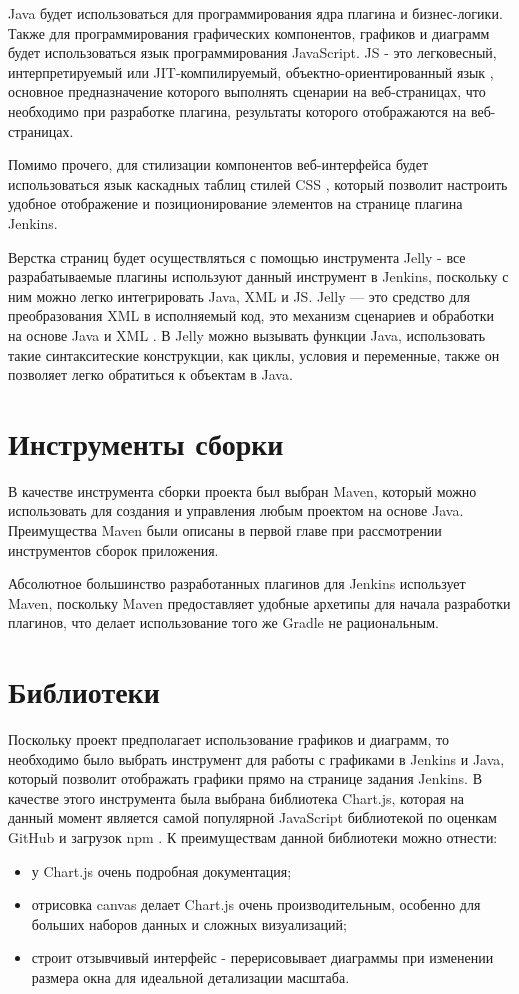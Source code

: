 Java будет использоваться для программирования ядра плагина и бизнес-логики. Также для программирования графических компонентов, графиков и диаграмм будет использоваться язык программирования JavaScript. JS - это легковесный, интерпретируемый или JIT-компилируемый, объектно-ориентированный язык \cite{js}, основное предназначение которого выполнять сценарии на веб-страницах, что необходимо при разработке плагина, результаты которого отображаются на веб-страницах.

Помимо прочего, для стилизации компонентов веб-интерфейса будет использоваться язык каскадных таблиц стилей CSS \cite{css}, который позволит настроить удобное отображение и позиционирование элементов на странице плагина Jenkins. 

Верстка страниц будет осуществляться с помощью инструмента Jelly - все разрабатываемые плагины используют данный инструмент в Jenkins, поскольку с ним можно легко интегрировать Java, XML и JS. Jelly — это средство для преобразования XML в исполняемый код, это механизм сценариев и обработки на основе Java и XML \cite{jelly}. В Jelly можно вызывать функции Java, использовать такие синтакситеские конструкции, как циклы, условия и переменные, также он позволяет легко обратиться к объектам в Java.

\section{Инструменты сборки} \label{ch1:sec5}

В качестве инструмента сборки проекта был выбран Maven, который можно использовать для создания и управления любым проектом на основе Java. Преимущества Maven были описаны в первой главе при рассмотрении инструментов сборок приложения.

Абсолютное большинство разработанных плагинов для Jenkins использует Maven, поскольку Maven предоставляет удобные архетипы для начала разработки плагинов, что делает использование того же Gradle не рациональным.


\section{Библиотеки} \label{ch1:sec6}

Поскольку проект предполагает использование графиков и диаграмм, то необходимо было выбрать инструмент для работы с графиками в Jenkins и Java, который позволит отображать графики прямо на странице задания Jenkins. В качестве этого инструмента была выбрана библиотека Chart.js, которая на данный момент является самой популярной JavaScript библиотекой по оценкам GitHub и загрузок npm \cite{chartjs}. К преимуществам данной библиотеки можно отнести: 
\begin{itemize}
	\item у Chart.js очень подробная документация;
	\item отрисовка canvas делает Chart.js очень производительным, особенно для больших наборов данных и сложных визуализаций;
	\item строит отзывчивый интерфейс - перерисовывает диаграммы при изменении размера окна для идеальной детализации масштаба.
\end{itemize}

